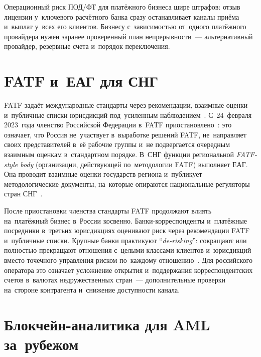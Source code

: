 Операционный риск ПОД/ФТ для платёжного бизнеса шире штрафов:
отзыв лицензии у~ключевого расчётного банка сразу останавливает каналы приёма
и~выплат у~всех его клиентов. Бизнесу с~зависимостью от~одного платёжного
провайдера нужен заранее проверенный план непрерывности~--- альтернативный
провайдер, резервные счета и~порядок переключения.

\section{FATF и~ЕАГ для СНГ}\label{sec:aml-fatf-eag}

FATF задаёт международные стандарты через рекомендации, взаимные оценки
и~публичные списки юрисдикций под~усиленным
наблюдением~\cite{fatf-recs,fatf-increased-monitoring}. С~24~февраля 2023~года
членство Российской Федерации в~FATF
приостановлено~\cite{fatf-russia-suspension-2023}: это означает, что
Россия не~участвует в~выработке решений FATF, не~направляет своих представителей
в~её рабочие группы и~не подвергается очередным взаимным оценкам в~стандартном
порядке. В~СНГ функции региональной \textit{FATF-style body} (организации,
действующей по~методологии FATF) выполняет ЕАГ. Она проводит взаимные оценки государств региона и~публикует методологические
документы, на~которые опираются национальные регуляторы стран
СНГ~\cite{eag-overview,eag-mutual-evaluations}.

После приостановки членства стандарты FATF продолжают влиять на~платёжный бизнес
в~России косвенно. Банки-корреспонденты и~платёжные посредники в~третьих
юрисдикциях оценивают риск через рекомендации FATF и~публичные списки. Крупные
банки практикуют \enquote{\textit{de-risking}}: сокращают или полностью
прекращают отношения с~целыми классами клиентов и~юрисдикций вместо точечного
управления риском по~каждому отношению~\cite{fatf-correspondent-banking}. Для российского оператора это
означает усложнение открытия и~поддержания корреспондентских счетов в~валютах
недружественных стран~--- дополнительные проверки на~стороне контрагента
и~снижение доступности канала.


\section{Блокчейн-аналитика для AML за~рубежом}\label{sec:aml-blockchain-analytics}

